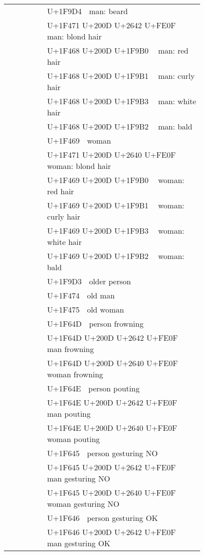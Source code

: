 \documentclass[a4paper,12pt]{ltjarticle}
\newcommand{\fontA}[1]{{\fontspec[RawFeature={mode=harf,+dist,+ccmp}]{Segoe UI Emoji} #1}}
\newcommand{\fontB}[1]{{\fontspec[RawFeature={mode=harf,+dist,+ccmp}]{Noto Color Emoji} #1}}
\begin{document}
\begin{longtable}[c]{ccp{0.8\linewidth}}
\fontA{🧔}&\fontB{🧔}&U+1F9D4 🧔 man: beard\\
\fontA{👱‍♂️}&\fontB{👱‍♂️}&U+1F471 U+200D U+2642 U+FE0F 👱‍♂️ man: blond hair\\
\fontA{👨‍🦰}&\fontB{👨‍🦰}&U+1F468 U+200D U+1F9B0 👨‍🦰 man: red hair\\
\fontA{👨‍🦱}&\fontB{👨‍🦱}&U+1F468 U+200D U+1F9B1 👨‍🦱 man: curly hair\\
\fontA{👨‍🦳}&\fontB{👨‍🦳}&U+1F468 U+200D U+1F9B3 👨‍🦳 man: white hair\\
\fontA{👨‍🦲}&\fontB{👨‍🦲}&U+1F468 U+200D U+1F9B2 👨‍🦲 man: bald\\
\fontA{👩}&\fontB{👩}&U+1F469 👩 woman\\
\fontA{👱‍♀️}&\fontB{👱‍♀️}&U+1F471 U+200D U+2640 U+FE0F 👱‍♀️ woman: blond hair\\
\fontA{👩‍🦰}&\fontB{👩‍🦰}&U+1F469 U+200D U+1F9B0 👩‍🦰 woman: red hair\\
\fontA{👩‍🦱}&\fontB{👩‍🦱}&U+1F469 U+200D U+1F9B1 👩‍🦱 woman: curly hair\\
\fontA{👩‍🦳}&\fontB{👩‍🦳}&U+1F469 U+200D U+1F9B3 👩‍🦳 woman: white hair\\
\fontA{👩‍🦲}&\fontB{👩‍🦲}&U+1F469 U+200D U+1F9B2 👩‍🦲 woman: bald\\
\fontA{🧓}&\fontB{🧓}&U+1F9D3 🧓 older person\\
\fontA{👴}&\fontB{👴}&U+1F474 👴 old man\\
\fontA{👵}&\fontB{👵}&U+1F475 👵 old woman\\
\fontA{🙍}&\fontB{🙍}&U+1F64D 🙍 person frowning\\
\fontA{🙍‍♂️}&\fontB{🙍‍♂️}&U+1F64D U+200D U+2642 U+FE0F 🙍‍♂️ man frowning\\
\fontA{🙍‍♀️}&\fontB{🙍‍♀️}&U+1F64D U+200D U+2640 U+FE0F 🙍‍♀️ woman frowning\\
\fontA{🙎}&\fontB{🙎}&U+1F64E 🙎 person pouting\\
\fontA{🙎‍♂️}&\fontB{🙎‍♂️}&U+1F64E U+200D U+2642 U+FE0F 🙎‍♂️ man pouting\\
\fontA{🙎‍♀️}&\fontB{🙎‍♀️}&U+1F64E U+200D U+2640 U+FE0F 🙎‍♀️ woman pouting\\
\fontA{🙅}&\fontB{🙅}&U+1F645 🙅 person gesturing NO\\
\fontA{🙅‍♂️}&\fontB{🙅‍♂️}&U+1F645 U+200D U+2642 U+FE0F 🙅‍♂️ man gesturing NO\\
\fontA{🙅‍♀️}&\fontB{🙅‍♀️}&U+1F645 U+200D U+2640 U+FE0F 🙅‍♀️ woman gesturing NO\\
\fontA{🙆}&\fontB{🙆}&U+1F646 🙆 person gesturing OK\\
\fontA{🙆‍♂️}&\fontB{🙆‍♂️}&U+1F646 U+200D U+2642 U+FE0F 🙆‍♂️ man gesturing OK\\

\end{longtable}
\end{document}
